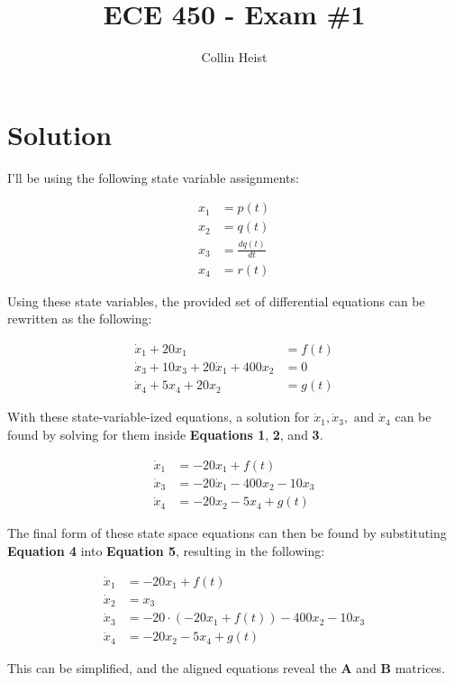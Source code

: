 \documentclass[11pt]{article}
\author{Collin Heist}
\title{ECE 450 - Exam \#1}
\begin{document}
    
    
    \maketitle
    
    
\section{Solution}
I'll be using the following state variable assignments:

\begin{align*}
x_1&=p(t)\\
x_2&=q(t)\\
x_3&=\frac{dq(t)}{dt} \\
x_4&=r(t)
\end{align*}

Using these state variables, the provided set of differential equations can be rewritten as the following:

\begin{align}
\dot{x}_1+20x_1&=f(t) \\
\dot{x}_3+10x_3+20\dot{x}_1+400x_2&=0 \\
\dot{x}_4+5x_4+20x_2&=g(t)
\end{align}

With these state-variable-ized equations, a solution for $\dot{x}_1, \dot{x}_3, \text{ and } \dot{x}_4$ can be found by solving for them inside \textbf{Equations 1}, \textbf{2}, and \textbf{3}.

\begin{align}
\dot{x}_1 &= -20x_1 + f(t) \\
\dot{x}_3 &= -20\dot{x}_1 -400x_2 -10x_3 \\
\dot{x}_4 &= -20x_2 -5x_4 + g(t)
\end{align}

The final form of these state space equations can then be found by substituting \textbf{Equation 4} into \textbf{Equation 5}, resulting in the following:

\begin{align*}
\dot{x}_1 &= -20x_1 + f(t) \\
\dot{x}_2 &= x_3 \\ 
\dot{x}_3 &= -20\cdot(-20x_1 + f(t)) -400x_2 -10x_3 \\
\dot{x}_4 &= -20x_2 -5x_4 + g(t)
\end{align*}

This can be simplified, and the aligned equations reveal the \textbf{A} and \textbf{B} matrices.
\end{document}

